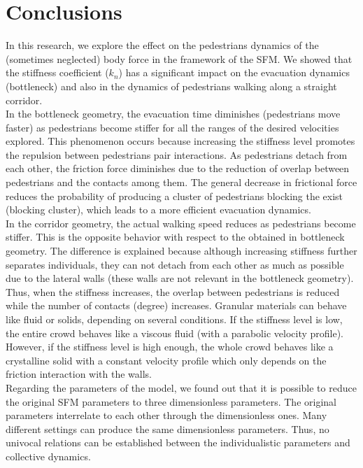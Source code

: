 \documentclass[preprint,12pt]{elsarticle}
\begin{document}
\section{\label{conclusions}Conclusions}


In this research, we explore the effect on the pedestrians dynamics of the (sometimes neglected) body force in the framework of the SFM. We showed that the stiffness coefficient ($k_n$) has a significant impact on the evacuation dynamics (bottleneck) and also in the dynamics of pedestrians walking along a straight corridor.\\

In the bottleneck geometry, the evacuation time diminishes (pedestrians move faster) as pedestrians become stiffer for all the ranges of the desired velocities explored. This phenomenon occurs because increasing the stiffness level promotes the repulsion between pedestrians pair interactions. As pedestrians detach from each other, the friction force diminishes due to the reduction of overlap between pedestrians and the contacts among them. The general decrease in frictional force reduces the probability of producing a cluster of pedestrians blocking the exist (blocking cluster), which leads to a more efficient evacuation dynamics. \\

In the corridor geometry, the actual walking speed reduces as pedestrians become stiffer. This is the opposite behavior with respect to the obtained in bottleneck geometry. The difference is explained because although increasing stiffness further separates individuals, they can not detach from each other as much as possible due to the lateral walls (these walls are not relevant in the bottleneck geometry). Thus, when the stiffness increases, the overlap between pedestrians is reduced while the number of contacts (degree) increases. Granular materials can behave like fluid or solids, depending on several conditions. If the stiffness level is low, the entire crowd behaves like a viscous fluid (with a parabolic velocity profile). However, if the stiffness level is high enough, the whole crowd behaves like a crystalline solid with a constant velocity profile which only depends on the friction interaction with the walls.\\

Regarding the parameters of the model, we found out that it is possible to reduce the original SFM parameters to three dimensionless parameters. The original parameters interrelate to each other through the dimensionless ones. Many different settings can produce the same dimensionless parameters. Thus, no univocal relations can be established between the individualistic parameters and collective dynamics.\\
\end{document}
